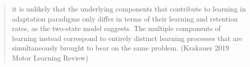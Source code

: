 \begin{quote}
it is unlikely that the underlying components that contribute to
learning in adaptation paradigms only differ in terms of their learning
and retention rates, as the two-state model suggests. The multiple
components of learning instead correspond to entirely distinct learning
processes that are simultaneously brought to bear on the same problem.
(Krakauer 2019 Motor Learning Review)
\end{quote}





